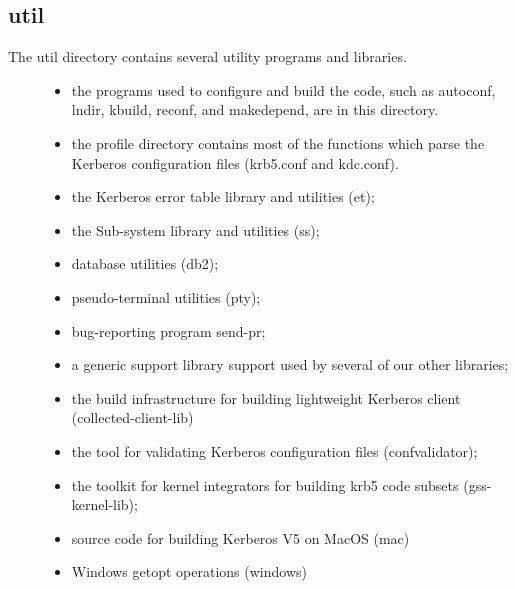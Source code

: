 \documentclass[letterpaper,10pt,english]{sphinxmanual}
\begin{document}
\subsection{util}
\label{build/directory_org:util}\label{build/directory_org:id2}\begin{description}
\item[{The util directory contains several utility programs and libraries.}] \leavevmode\begin{itemize}
\item {} 
the programs used to configure and build the code, such as
autoconf, lndir, kbuild, reconf, and makedepend, are in this
directory.

\item {} 
the profile directory contains most of the functions which parse
the Kerberos configuration files (krb5.conf and kdc.conf).

\item {} 
the Kerberos error table library and utilities (et);

\item {} 
the Sub-system library and utilities (ss);

\item {} 
database utilities (db2);

\item {} 
pseudo-terminal utilities (pty);

\item {} 
bug-reporting program send-pr;

\item {} 
a generic support library support used by several of our other
libraries;

\item {} 
the build infrastructure for building lightweight Kerberos client
(collected-client-lib)

\item {} 
the tool for validating Kerberos configuration files
(confvalidator);

\item {} 
the toolkit for kernel integrators for building krb5 code subsets
(gss-kernel-lib);

\item {} 
source code for building Kerberos V5 on MacOS (mac)

\item {} 
Windows getopt operations (windows)

\end{itemize}

\end{description}
\end{document}
